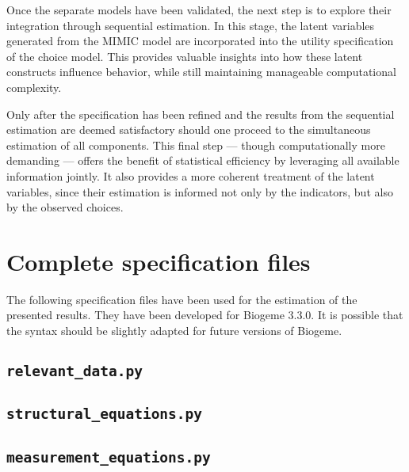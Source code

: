 \documentclass[12pt,a4paper]{article}
\begin{document}
Once the separate models have been validated, the next step is to
explore their integration through sequential estimation. In this
stage, the latent variables generated from the MIMIC model are
incorporated into the utility specification of the choice model. This
provides valuable insights into how these latent constructs influence
behavior, while still maintaining manageable computational complexity.

Only after the specification has been refined and the results from the
sequential estimation are deemed satisfactory should one proceed to
the simultaneous estimation of all components. This final step --- though
computationally more demanding --- offers the benefit of statistical
efficiency by leveraging all available information jointly. It also
provides a more coherent treatment of the latent variables, since
their estimation is informed not only by the indicators, but also by
the observed choices.



\clearpage
\section{Complete specification files}

The following specification files have been used for the estimation of the presented results. They have been developed for Biogeme 3.3.0. It is possible that the syntax should be slightly adapted for future versions of Biogeme.

\subsection{\lstinline$relevant_data.py$}
\label{sec:relevant_data.py}




\subsection{\lstinline$structural_equations.py$}
\label{sec:structural_equations.py}



\subsection{\lstinline$measurement_equations.py$}
\label{sec:measurement_equations.py}
\end{document}
